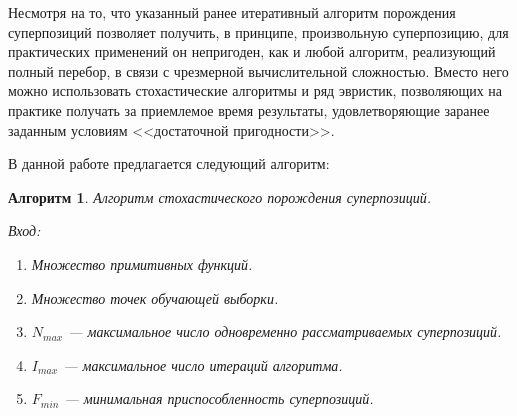 \documentclass[12pt,a4paper]{amsart}
\newtheorem{algo}{Алгоритм}
\begin{document}
Несмотря на то, что указанный ранее итеративный алгоритм порождения
суперпозиций позволяет получить, в принципе, произвольную суперпозицию,
для практических применений он непригоден, как и любой алгоритм, реализующий
полный перебор, в связи с чрезмерной вычислительной сложностью. Вместо него
можно использовать стохастические алгоритмы и ряд эвристик, позволяющих на
практике получать за приемлемое время результаты, удовлетворяющие заранее
заданным условиям <<достаточной пригодности>>.

В данной работе предлагается следующий алгоритм:

\begin{algo}
  Алгоритм стохастического порождения суперпозиций.

  Вход:
  \begin{enumerate}
	\item Множество примитивных функций.
	\item Множество точек обучающей выборки.
	\item $N_{max}$ --- максимальное число одновременно рассматриваемых
	  суперпозиций.
	\item $I_{max}$ --- максимальное число итераций алгоритма.
	\item $F_{min}$ --- минимальная приспособленность суперпозиций.
  \end{enumerate}


\end{algo}
\end{document}
